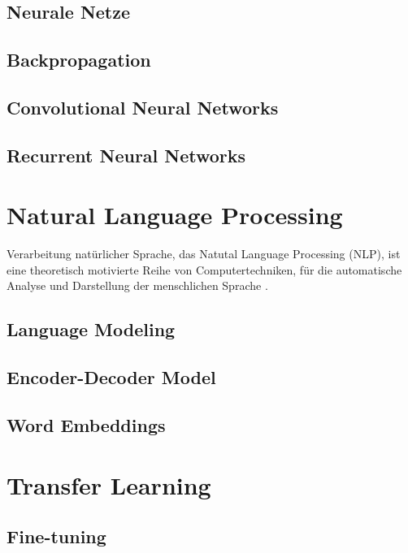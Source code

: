 \documentclass[
        ngerman,
        paper=a4,
        numbers=noendperiod,
]{scrreprt}
\begin{document}
\subsection{Neurale Netze}
\subsection{Backpropagation}
\subsection{Convolutional Neural Networks}
\subsection{Recurrent Neural Networks}



\section{Natural Language Processing}

Verarbeitung natürlicher Sprache, das Natutal Language Processing (NLP), ist eine theoretisch motivierte Reihe von Computertechniken, für die automatische Analyse und Darstellung der menschlichen Sprache \citep[S. 48]{cambria2014jumping}.


\subsection{Language Modeling}
\subsection{Encoder-Decoder Model}
\subsection{Word Embeddings}







\section{Transfer Learning}
\subsection{Fine-tuning}
\end{document}
